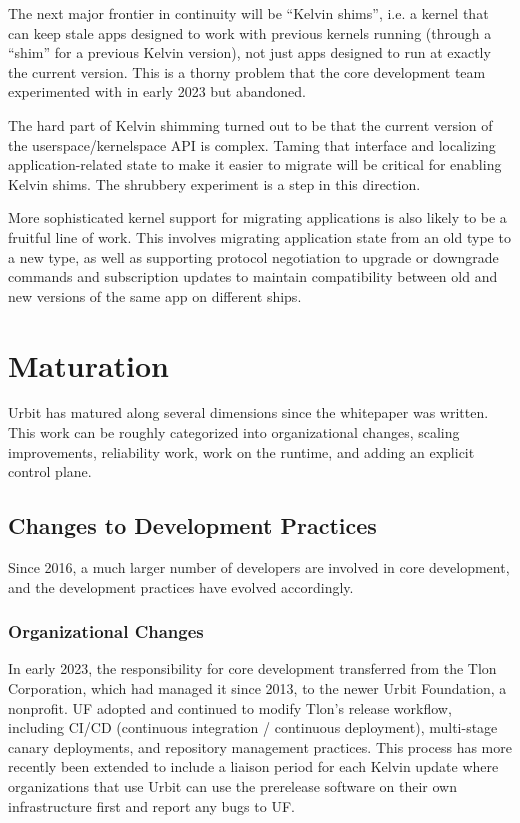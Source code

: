 \documentclass[twoside]{article}
\begin{document}
The next major frontier in continuity will be ``Kelvin shims'', i.e. a kernel that can keep stale apps designed to work with previous kernels running (through a ``shim'' for a previous Kelvin version), not just apps designed to run at exactly the current version.  This is a thorny problem that the core development team experimented with in early 2023 but abandoned.

The hard part of Kelvin shimming turned out to be that the current version of the userspace/kernelspace API is complex.  Taming that interface and localizing application-related state to make it easier to migrate will be critical for enabling Kelvin shims.  The shrubbery experiment is a step in this direction.

More sophisticated kernel support for migrating applications is also likely to be a fruitful line of work.  This involves migrating application state from an old type to a new type, as well as supporting protocol negotiation to upgrade or downgrade commands and subscription updates to maintain compatibility between old and new versions of the same app on different ships.

\section{Maturation}

Urbit has matured along several dimensions since the whitepaper was written.  This work can be roughly categorized into organizational changes, scaling improvements, reliability work, work on the runtime, and adding an explicit control plane.

\subsection{Changes to Development Practices}

Since 2016, a much larger number of developers are involved in core development, and the development practices have evolved accordingly.

\subsubsection{Organizational Changes}

In early 2023, the responsibility for core development transferred from the Tlon Corporation, which had managed it since 2013, to the newer Urbit Foundation, a nonprofit.  UF adopted and continued to modify Tlon's release workflow, including CI/CD (continuous integration / continuous deployment), multi-stage canary deployments, and repository management practices.  This process has more recently been extended to include a liaison period for each Kelvin update where organizations that use Urbit can use the prerelease software on their own infrastructure first and report any bugs to UF.
\end{document}
